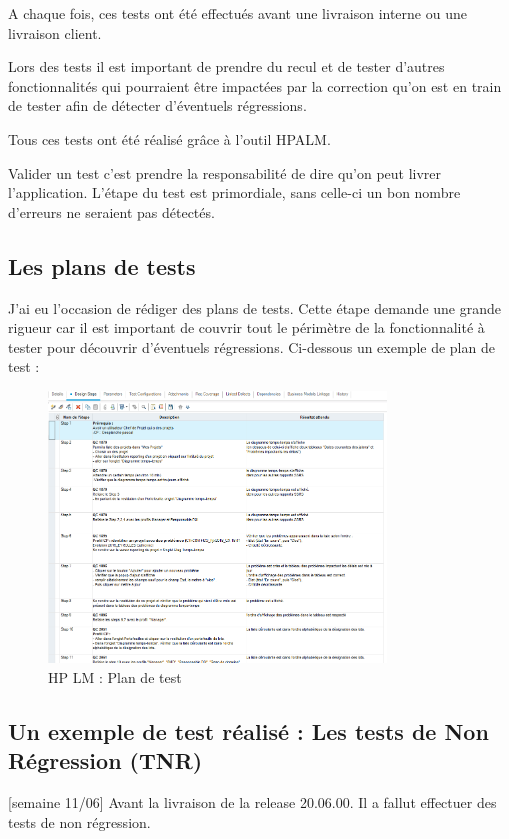 A chaque fois, ces tests ont été effectués avant une livraison interne ou une livraison client.

Lors des tests il est important de prendre du recul et de tester d'autres fonctionnalités qui pourraient être impactées par la correction qu'on est en train de tester afin de détecter d'éventuels régressions.

Tous ces tests ont été réalisé grâce à l'outil HPALM.
        
Valider un test c'est prendre la responsabilité de dire qu'on peut livrer l'application. L'étape du test est primordiale, sans celle-ci un bon nombre d'erreurs ne seraient pas détectés.

\subsection{Les plans de tests}

J'ai eu l'occasion de rédiger des plans de tests. Cette étape demande une grande rigueur car il est important de couvrir tout le périmètre de la fonctionnalité à tester pour découvrir d'éventuels régressions. Ci-dessous un exemple de plan de test :

\begin{figure}[!h]
\centering
\includegraphics[width=0.8\textwidth]{images/HPLMplantest.png}
\caption{HP LM : Plan de test}
\end{figure}

\subsection{Un exemple de test réalisé : Les tests de Non Régression (TNR)}

[semaine 11/06]
Avant la livraison de la release 20.06.00. Il a fallut effectuer des tests de non régression.

